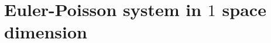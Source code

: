 \documentclass[10pt, letterpaper]{article}
\theoremstyle{definition}
\theoremstyle{remark}
\begin{document}
% 
% 
% 

\section{Euler-Poisson system in $1$ space dimension} \label{sec:EP}
\end{document}
